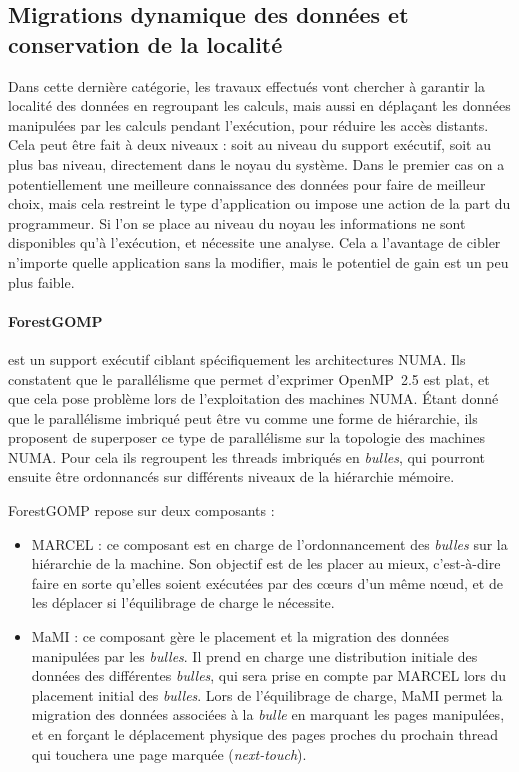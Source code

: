 \subsection{Migrations dynamique des données et conservation de la localité}\label{sec:rw:numa:thread-data}

Dans cette dernière catégorie, les travaux effectués vont chercher à garantir la localité des données en regroupant les calculs, mais aussi en déplaçant les données manipulées par les calculs pendant l'exécution, pour réduire les accès distants.
Cela peut être fait à deux niveaux : soit au niveau du support exécutif, soit au plus bas niveau, directement dans le noyau du système.
Dans le premier cas on a potentiellement une meilleure connaissance des données pour faire de meilleur choix, mais cela restreint le type d'application ou impose une action de la part du programmeur.
Si l'on se place au niveau du noyau les informations ne sont disponibles qu'à l'exécution, et nécessite une analyse. Cela a l'avantage de cibler n'importe quelle application sans la modifier, mais le potentiel de gain est un peu plus faible.

\paragraph{ForestGOMP~\cite{Broquedis2010a}} est un support exécutif ciblant spécifiquement les architectures NUMA.
Ils constatent que le parallélisme que permet d'exprimer OpenMP~2.5 est plat, et que cela pose problème lors de l'exploitation des machines NUMA.
Étant donné que le parallélisme imbriqué peut être vu comme une forme de hiérarchie, ils proposent de superposer ce type de parallélisme sur la topologie des machines NUMA.
Pour cela ils regroupent les threads imbriqués en \emph{bulles}, qui pourront ensuite être ordonnancés sur différents niveaux de la hiérarchie mémoire.


ForestGOMP repose sur deux composants :
\begin{itemize}
  \item MARCEL : ce composant est en charge de l'ordonnancement des \emph{bulles} sur la hiérarchie de la machine. Son objectif est de les placer au mieux, c'est-à-dire faire en sorte qu'elles soient exécutées par des cœurs d'un même nœud, et de les déplacer si l'équilibrage de charge le nécessite.
  \item MaMI : ce composant gère le placement et la migration des données manipulées par les \emph{bulles}.
Il prend en charge une distribution initiale des données des différentes \emph{bulles}, qui sera prise en compte par MARCEL lors du placement initial des \emph{bulles}.
Lors de l'équilibrage de charge, MaMI permet la migration des données associées à la \emph{bulle} en marquant les pages manipulées, et en forçant le déplacement physique des pages proches du prochain thread qui touchera une page marquée (\emph{next-touch}).
\end{itemize}

